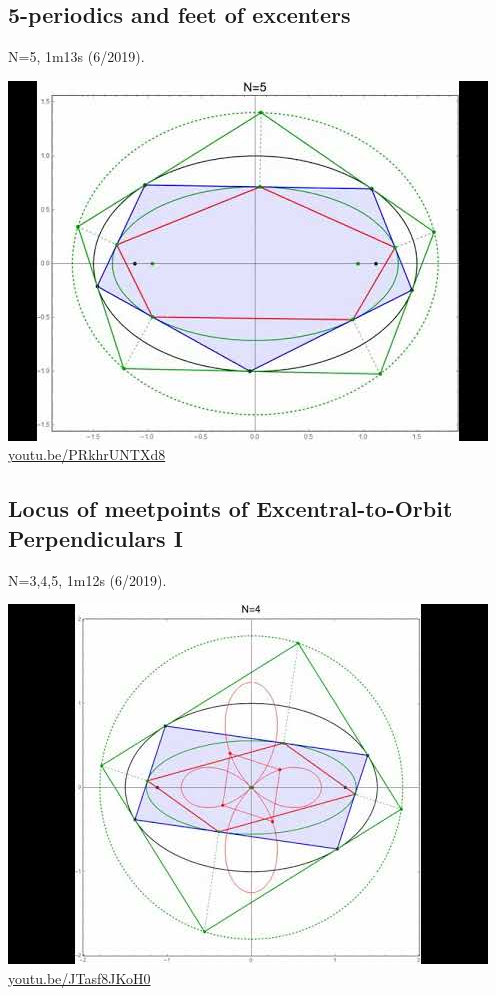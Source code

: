 \documentclass[12pt]{amsart}
\begin{document}
\subsection{5-periodics and feet of excenters}
\label{vid:PRkhrUNTXd8}
\noindent N=5, 1m13s (6/2019). 
\begin{center}\includegraphics[width=.5\textwidth]{pics/PRkhrUNTXd8.jpg} \\ 
\href{https://youtu.be/PRkhrUNTXd8}{\url{youtu.be/PRkhrUNTXd8}}\end{center}
% 

\subsection{Locus of meetpoints of Excentral-to-Orbit Perpendiculars I}
\label{vid:JTasf8JKoH0}
\noindent N=3,4,5, 1m12s (6/2019). 
\begin{center}\includegraphics[width=.5\textwidth]{pics/JTasf8JKoH0.jpg} \\ 
\href{https://youtu.be/JTasf8JKoH0}{\url{youtu.be/JTasf8JKoH0}}\end{center}
% 
\end{document}
